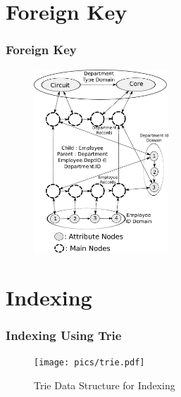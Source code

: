 \documentclass[12pt,xcolor=dvipsnames]{beamer}
\begin{document}
\section{Foreign Key}
\begin{frame}
 \frametitle{Foreign Key}
 \begin{figure}[h]
 \centering
 \includegraphics[width=0.45\textwidth]{pics/foreign_key.pdf}
\end{figure}
\end{frame}

\section{Indexing}
\begin{frame}
 \frametitle{Indexing Using Trie}
 \begin{figure}
 \centering
 \texttt{[image: pics/trie.pdf]}
 \caption{Trie Data Structure for Indexing}
\end{figure}
\end{frame}
\end{document}
